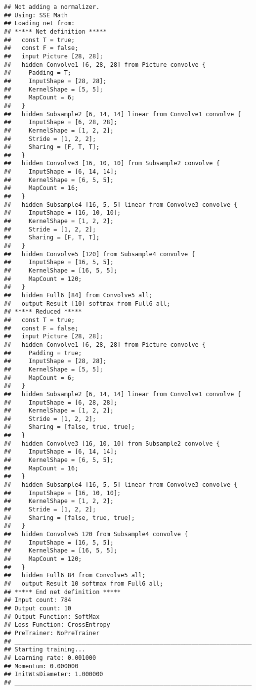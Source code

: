 \documentclass[]{book}
\theoremstyle{definition}
\theoremstyle{definition}
\theoremstyle{definition}
\theoremstyle{remark}
\begin{document}
\begin{verbatim}
## Not adding a normalizer.
## Using: SSE Math
## Loading net from: 
## ***** Net definition *****
##   const T = true;
##   const F = false;
##   input Picture [28, 28];
##   hidden Convolve1 [6, 28, 28] from Picture convolve {
##     Padding = T;
##     InputShape = [28, 28];
##     KernelShape = [5, 5];
##     MapCount = 6;
##   }
##   hidden Subsample2 [6, 14, 14] linear from Convolve1 convolve {
##     InputShape = [6, 28, 28];
##     KernelShape = [1, 2, 2];
##     Stride = [1, 2, 2];
##     Sharing = [F, T, T];
##   }
##   hidden Convolve3 [16, 10, 10] from Subsample2 convolve {
##     InputShape = [6, 14, 14];
##     KernelShape = [6, 5, 5];
##     MapCount = 16;
##   }
##   hidden Subsample4 [16, 5, 5] linear from Convolve3 convolve {
##     InputShape = [16, 10, 10];
##     KernelShape = [1, 2, 2];
##     Stride = [1, 2, 2];
##     Sharing = [F, T, T];
##   }
##   hidden Convolve5 [120] from Subsample4 convolve {
##     InputShape = [16, 5, 5];
##     KernelShape = [16, 5, 5];
##     MapCount = 120;
##   }
##   hidden Full6 [84] from Convolve5 all;
##   output Result [10] softmax from Full6 all;
## ***** Reduced *****
##   const T = true;
##   const F = false;
##   input Picture [28, 28];
##   hidden Convolve1 [6, 28, 28] from Picture convolve {
##     Padding = true;
##     InputShape = [28, 28];
##     KernelShape = [5, 5];
##     MapCount = 6;
##   }
##   hidden Subsample2 [6, 14, 14] linear from Convolve1 convolve {
##     InputShape = [6, 28, 28];
##     KernelShape = [1, 2, 2];
##     Stride = [1, 2, 2];
##     Sharing = [false, true, true];
##   }
##   hidden Convolve3 [16, 10, 10] from Subsample2 convolve {
##     InputShape = [6, 14, 14];
##     KernelShape = [6, 5, 5];
##     MapCount = 16;
##   }
##   hidden Subsample4 [16, 5, 5] linear from Convolve3 convolve {
##     InputShape = [16, 10, 10];
##     KernelShape = [1, 2, 2];
##     Stride = [1, 2, 2];
##     Sharing = [false, true, true];
##   }
##   hidden Convolve5 120 from Subsample4 convolve {
##     InputShape = [16, 5, 5];
##     KernelShape = [16, 5, 5];
##     MapCount = 120;
##   }
##   hidden Full6 84 from Convolve5 all;
##   output Result 10 softmax from Full6 all;
## ***** End net definition *****
## Input count: 784
## Output count: 10
## Output Function: SoftMax
## Loss Function: CrossEntropy
## PreTrainer: NoPreTrainer
## ___________________________________________________________________
## Starting training...
## Learning rate: 0.001000
## Momentum: 0.000000
## InitWtsDiameter: 1.000000
## ___________________________________________________________________

\end{verbatim}
\end{document}
